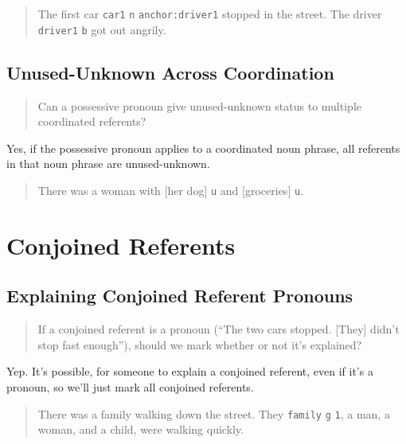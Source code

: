 \documentclass[
]{book}
\begin{document}
\begin{quote}
The first car \texttt{car1} \texttt{n} \texttt{anchor:driver1} stopped in the street.
The driver \texttt{driver1} \texttt{b} got out angrily.
\end{quote}

\hypertarget{unused-unknown-across-coordination}{%
\subsection{Unused-Unknown Across Coordination}\label{unused-unknown-across-coordination}}

\begin{quote}
Can a possessive pronoun give unused-unknown status to multiple coordinated referents?
\end{quote}

Yes,
if the possessive pronoun applies to a coordinated noun phrase,
all referents in that noun phrase are unused-unknown.

\begin{quote}
There was a woman with {[}her dog{]} \texttt{u} and {[}groceries{]} \texttt{u}.
\end{quote}

\hypertarget{conjoined-referents}{%
\section{Conjoined Referents}\label{conjoined-referents}}

\hypertarget{explaining-conjoined-referent-pronouns}{%
\subsection{Explaining Conjoined Referent Pronouns}\label{explaining-conjoined-referent-pronouns}}

\begin{quote}
If a conjoined referent is a pronoun
(``The two cars stopped. {[}They{]} didn't stop fast enough''),
should we mark whether or not it's explained?
\end{quote}

Yep.
It's possible, for someone to explain a conjoined referent, even if it's a pronoun, so we'll just mark all conjoined referents.

\begin{quote}
There was a family walking down the street.
They \texttt{family} \texttt{g} \texttt{1}, a man, a woman, and a child, were walking quickly.
\end{quote}
\end{document}
